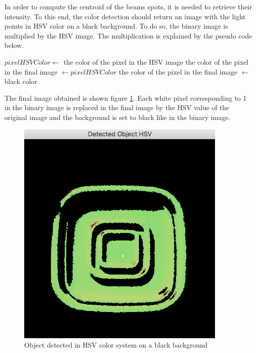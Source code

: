 In order to compute the centroid of the beams spots, it is needed to retrieve their intensity. To this end, the color detection should return an image with the light points in HSV color on a black background. To do so, the binary image is multiplied by the HSV image. The multiplication is explained by the pseudo code below.\\

\begin{algorithmic}
    			\State $pixelHSVColor \gets$ the color of the pixel in the HSV image
    			\State the color of the pixel in the final image $\gets pixelHSVColor$
		\Else
        			\State the color of the pixel in the final image $\gets$ black color
		\EndIf
	\EndFor
\EndFunction
\end{algorithmic}

The final image obtained is shown figure \ref{fig:finalImage}. Each white pixel corresponding to 1 in the binary image is replaced in the final image by the HSV value of the original image and the background is set to black like in the binary image.

\begin{figure}[h]
  \centering
  \includegraphics[scale=0.6]{fig/finalImage.png}
  \caption{Object detected in HSV color system on a black background}
  \label{fig:finalImage}
\end{figure}

